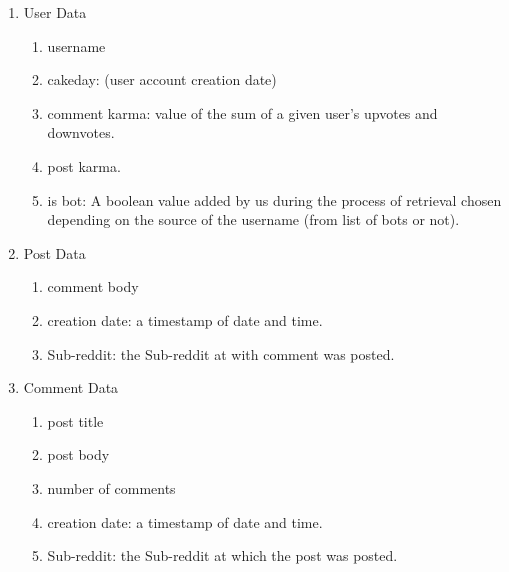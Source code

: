 \documentclass{article}
\begin{document}
        \begin{enumerate}
            \item User Data
                \begin{enumerate}
                    \item username
                    \item cakeday: (user account creation date)
                    \item comment karma: value of the sum of a given user's upvotes and downvotes.
                    \item post karma.
                    \item is bot: A boolean value added by us during the process of retrieval chosen depending on the source of the username (from list of bots or not).
                \end{enumerate}
            \item Post Data
                \begin{enumerate}
                    \item comment body
                    \item creation date: a timestamp of date and time.
                    \item Sub-reddit: the Sub-reddit at with comment was posted.
                \end{enumerate}
            \item Comment Data
                \begin{enumerate}
                    \item post title
                    \item post body
                    \item number of comments
                    \item creation date: a timestamp of date and time.
                    \item Sub-reddit: the Sub-reddit at which the post was posted.
                \end{enumerate}
        \end{enumerate}
    
    
\end{document}
